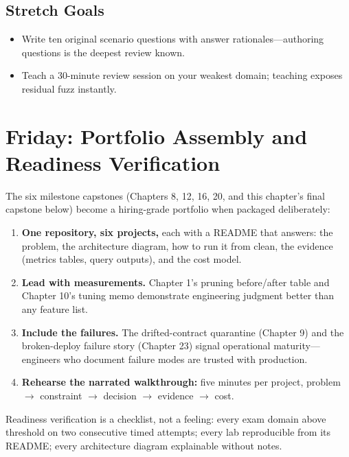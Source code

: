 \subsection*{Stretch Goals}
\begin{itemize}
    \item Write ten original scenario questions with answer rationales---authoring questions is the deepest review known.
    \item Teach a 30-minute review session on your weakest domain; teaching exposes residual fuzz instantly.
\end{itemize}

\section{Friday: Portfolio Assembly and Readiness Verification}
The six milestone capstones (Chapters 8, 12, 16, 20, and this chapter's final capstone below) become a hiring-grade portfolio when packaged deliberately:

\begin{enumerate}
    \item \textbf{One repository, six projects,} each with a README that answers: the problem, the architecture diagram, how to run it from clean, the evidence (metrics tables, query outputs), and the cost model.
    \item \textbf{Lead with measurements.} Chapter 1's pruning before/after table and Chapter 10's tuning memo demonstrate engineering judgment better than any feature list.
    \item \textbf{Include the failures.} The drifted-contract quarantine (Chapter 9) and the broken-deploy failure story (Chapter 23) signal operational maturity---engineers who document failure modes are trusted with production.
    \item \textbf{Rehearse the narrated walkthrough:} five minutes per project, problem $\rightarrow$ constraint $\rightarrow$ decision $\rightarrow$ evidence $\rightarrow$ cost.
\end{enumerate}

Readiness verification is a checklist, not a feeling: every exam domain above threshold on two consecutive timed attempts; every lab reproducible from its README; every architecture diagram explainable without notes.

